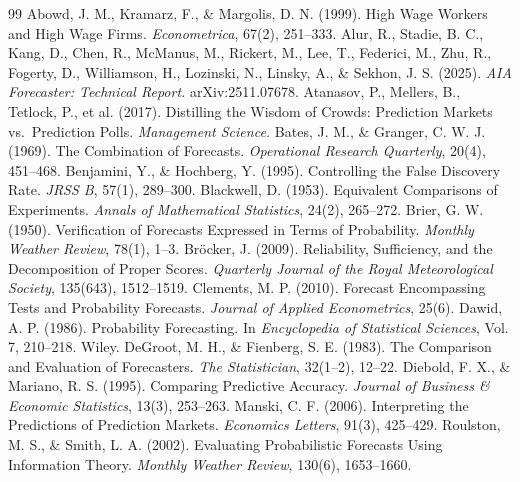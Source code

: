 \documentclass[11pt]{article}
\begin{document}
\begin{thebibliography}{99}
\setlength{\itemsep}{1pt}
 Abowd, J. M., Kramarz, F., \& Margolis, D. N. (1999). High Wage Workers and High Wage Firms. \emph{Econometrica}, 67(2), 251--333.
 Alur, R., Stadie, B. C., Kang, D., Chen, R., McManus, M., Rickert, M., Lee, T., Federici, M., Zhu, R., Fogerty, D., Williamson, H., Lozinski, N., Linsky, A., \& Sekhon, J. S. (2025). \emph{AIA Forecaster: Technical Report.} arXiv:2511.07678.
 Atanasov, P., Mellers, B., Tetlock, P., et al. (2017). Distilling the Wisdom of Crowds: Prediction Markets vs.\ Prediction Polls. \emph{Management Science.}
 Bates, J. M., \& Granger, C. W. J. (1969). The Combination of Forecasts. \emph{Operational Research Quarterly}, 20(4), 451--468.
 Benjamini, Y., \& Hochberg, Y. (1995). Controlling the False Discovery Rate. \emph{JRSS B}, 57(1), 289--300.
 Blackwell, D. (1953). Equivalent Comparisons of Experiments. \emph{Annals of Mathematical Statistics}, 24(2), 265--272.
 Brier, G. W. (1950). Verification of Forecasts Expressed in Terms of Probability. \emph{Monthly Weather Review}, 78(1), 1--3.
 Bröcker, J. (2009). Reliability, Sufficiency, and the Decomposition of Proper Scores. \emph{Quarterly Journal of the Royal Meteorological Society}, 135(643), 1512--1519.
 Clements, M. P. (2010). Forecast Encompassing Tests and Probability Forecasts. \emph{Journal of Applied Econometrics}, 25(6).
 Dawid, A. P. (1986). Probability Forecasting. In \emph{Encyclopedia of Statistical Sciences}, Vol. 7, 210--218. Wiley.
 DeGroot, M. H., \& Fienberg, S. E. (1983). The Comparison and Evaluation of Forecasters. \emph{The Statistician}, 32(1--2), 12--22.
 Diebold, F. X., \& Mariano, R. S. (1995). Comparing Predictive Accuracy. \emph{Journal of Business \& Economic Statistics}, 13(3), 253--263.
 Manski, C. F. (2006). Interpreting the Predictions of Prediction Markets. \emph{Economics Letters}, 91(3), 425--429.
 Roulston, M. S., \& Smith, L. A. (2002). Evaluating Probabilistic Forecasts Using Information Theory. \emph{Monthly Weather Review}, 130(6), 1653--1660.

\end{thebibliography}
\end{document}
